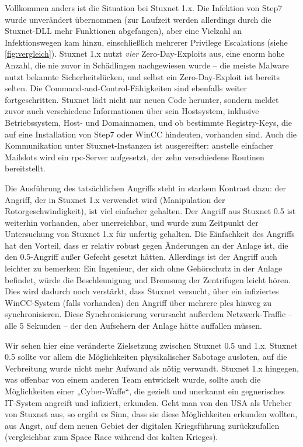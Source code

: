 \documentclass[a4paper]{article}
\begin{document}
Vollkommen anders ist die Situation bei Stuxnet 1.x.
Die Infektion von Step7 wurde unverändert übernommen (zur Laufzeit werden allerdings durch die Stuxnet-DLL mehr Funktionen abgefangen),
aber eine Vielzahl an Infektionswegen kam hinzu, einschließlich mehrerer Privilege Escalations (siehe \autoref{fig:vergleich}).
Stuxnet 1.x nutzt \emph{vier} Zero-Day-Exploits aus, eine enorm hohe Anzahl, die nie zuvor in Schädlingen nachgewiesen wurde –
die meiste Malware nutzt bekannte Sicherheitslücken, und selbst ein Zero-Day-Exploit ist bereits selten.
Die Command-and-Control-Fähigkeiten sind ebenfalls weiter fortgeschritten.
Stuxnet lädt nicht nur neuen Code herunter, sondern meldet zuvor auch verschiedene Informationen über sein Hostsystem,
inklusive Betriebssystem, Host- und Domainnamen, und ob bestimmte Registry-Keys, die auf eine Installation von Step7 oder WinCC hindeuten, vorhanden sind.
Auch die Kommunikation unter Stuxnet-Instanzen ist ausgereifter:
anstelle einfacher Mailslots wird ein \gls{rpc}-Server aufgesetzt, der zehn verschiedene Routinen bereitstellt. %

Die Ausführung des tatsächlichen Angriffs steht in starkem Kontrast dazu:
der Angriff, der in Stuxnet 1.x verwendet wird (Manipulation der Rotorgeschwindigkeit),
ist viel einfacher gehalten.
Der Angriff aus Stuxnet 0.5 ist weiterhin vorhanden, aber unerreichbar, und wurde zum Zeitpunkt der Untersuchung von Stuxnet 1.x für unfertig gehalten.\cite{dossier}
Die Einfachkeit des Angriffs hat den Vorteil, dass er relativ robust gegen Änderungen an der Anlage ist, die den 0.5-Angriff außer Gefecht gesetzt hätten.
Allerdings ist der Angriff auch leichter zu bemerken:
Ein Ingenieur, der sich ohne Gehörschutz in der Anlage befindet, würde die Beschleunigung und Bremsung der Zentrifugen leicht hören.
Dies wird dadurch noch verstärkt, dass Stuxnet versucht, über ein infiziertes WinCC-System (falls vorhanden) den Angriff über mehrere \glspl{plc} hinweg zu synchronisieren.
Diese Synchronisierung verursacht außerdem Netzwerk-Traffic – alle 5 Sekunden – der den Aufsehern der Anlage hätte auffallen müssen.

Wir sehen hier eine veränderte Zielsetzung zwischen Stuxnet 0.5 und 1.x.
Stuxnet 0.5 sollte vor allem die Möglichkeiten physikalischer Sabotage ausloten, auf die Verbreitung wurde nicht mehr Aufwand als nötig verwandt.
Stuxnet 1.x hingegen, was offenbar von einem anderen Team entwickelt wurde\cite{05}, %
sollte auch die Möglichkeiten einer „Cyber-Waffe“, die gezielt und unerkannt ein gegnerisches IT-System angreift und infiziert, erkunden.
Geht man von den USA als Urheber von Stuxnet aus, so ergibt es Sinn, dass sie diese Möglichkeiten erkunden wollten,
aus Angst, auf dem neuen Gebiet der digitalen Kriegsführung zurückzufallen (vergleichbar zum Space Race während des kalten Krieges).
\end{document}
